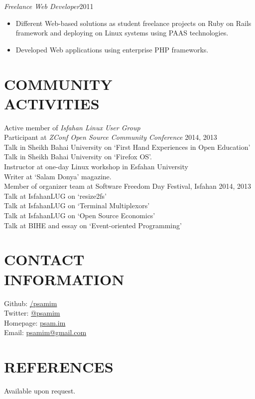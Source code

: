 \documentclass[margin, 10pt]{res} %
\begin{document}
\begin{resume}
{\sl Freelance Web Developer}\hfill 2011 \\
\begin{itemize}
\item Different Web-based solutions as student freelance projects on Ruby on Rails
  framework and deploying on Linux systems using PAAS technologies.
\item Developed Web applications using enterprise PHP frameworks.
\end{itemize} 


\section{COMMUNITY \\ ACTIVITIES}

Active member of {\it Isfahan Linux User Group} \\
Participant at {\it ZConf Open Source Community Conference} 2014, 2013 \\
Talk in Sheikh Bahai University on `First Hand Experiences in Open Education' \\
Talk in Sheikh Bahai University on `Firefox OS'. \\
Instructor at one-day Linux workshop in Esfahan University \\
Writer at `Salam Donya' magazine. \\
Member of organizer team at Software Freedom Day Festival, Isfahan 2014, 2013 \\
Talk at IsfahanLUG on `resize2fs' \\
Talk at IsfahanLUG on `Terminal Multiplexors' \\
Talk at IsfahanLUG on `Open Source Economics' \\
Talk at BIHE and essay on `Event-oriented Programming'


\section{CONTACT \\ INFORMATION}
Github: \href{http://github.com/psamim}{/\/psamim} \\
Twitter: \href{http://twitter.com/psamim}{@psamim} \\
Homepage: \href{http://www.psam.im/}{psam.im} \\
Email: \href{mailto:psamim@gmail.com}{psamim@gmail.com}

\section{REFERENCES}
Available upon request.


\end{resume}
\end{document}
